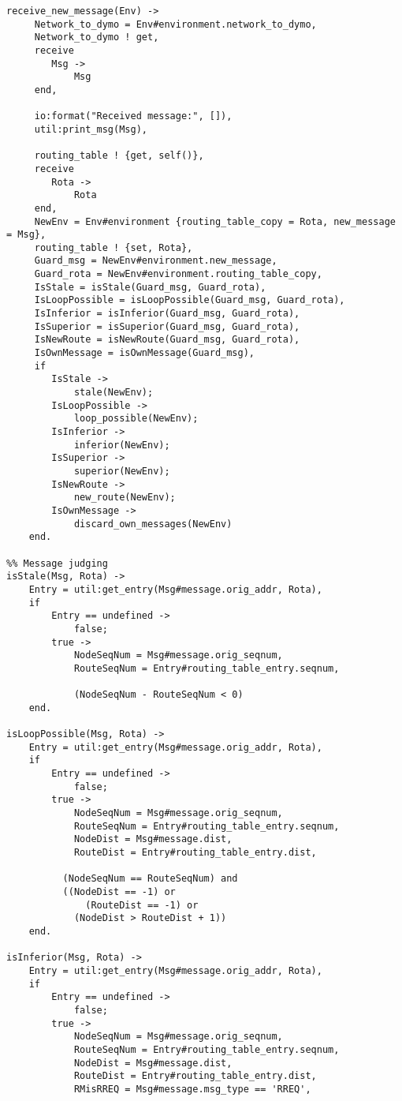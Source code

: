 \begin{verbatim}
receive_new_message(Env) -> 
     Network_to_dymo = Env#environment.network_to_dymo,
     Network_to_dymo ! get,
     receive 
        Msg -> 
            Msg
     end,
    
     io:format("Received message:", []),
     util:print_msg(Msg),
    
     routing_table ! {get, self()},
     receive 
        Rota -> 
            Rota
     end,
     NewEnv = Env#environment {routing_table_copy = Rota, new_message = Msg},
     routing_table ! {set, Rota},
     Guard_msg = NewEnv#environment.new_message,
     Guard_rota = NewEnv#environment.routing_table_copy,
     IsStale = isStale(Guard_msg, Guard_rota),
     IsLoopPossible = isLoopPossible(Guard_msg, Guard_rota),
     IsInferior = isInferior(Guard_msg, Guard_rota),
     IsSuperior = isSuperior(Guard_msg, Guard_rota),
     IsNewRoute = isNewRoute(Guard_msg, Guard_rota),
     IsOwnMessage = isOwnMessage(Guard_msg),
     if
        IsStale ->
            stale(NewEnv);
        IsLoopPossible ->
            loop_possible(NewEnv);
        IsInferior ->
            inferior(NewEnv);
        IsSuperior ->
            superior(NewEnv);
        IsNewRoute ->
            new_route(NewEnv);
        IsOwnMessage ->
            discard_own_messages(NewEnv)
    end.

%% Message judging
isStale(Msg, Rota) ->
    Entry = util:get_entry(Msg#message.orig_addr, Rota),
    if
        Entry == undefined ->
            false;
        true ->
            NodeSeqNum = Msg#message.orig_seqnum,
            RouteSeqNum = Entry#routing_table_entry.seqnum,
    
            (NodeSeqNum - RouteSeqNum < 0)
    end.
    
isLoopPossible(Msg, Rota) ->
    Entry = util:get_entry(Msg#message.orig_addr, Rota),
    if
        Entry == undefined ->
            false;
        true ->
            NodeSeqNum = Msg#message.orig_seqnum,
            RouteSeqNum = Entry#routing_table_entry.seqnum,
            NodeDist = Msg#message.dist,
            RouteDist = Entry#routing_table_entry.dist,
            
          (NodeSeqNum == RouteSeqNum) and
          ((NodeDist == -1) or
              (RouteDist == -1) or
            (NodeDist > RouteDist + 1))
    end.

isInferior(Msg, Rota) ->
    Entry = util:get_entry(Msg#message.orig_addr, Rota),
    if
        Entry == undefined ->
            false;
        true ->    
            NodeSeqNum = Msg#message.orig_seqnum,
            RouteSeqNum = Entry#routing_table_entry.seqnum,
            NodeDist = Msg#message.dist,
            RouteDist = Entry#routing_table_entry.dist,
            RMisRREQ = Msg#message.msg_type == 'RREQ',
            

\end{verbatim}

